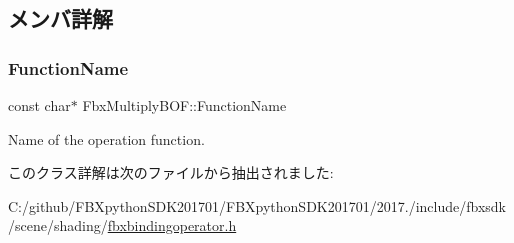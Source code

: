 \subsection{メンバ詳解}
\mbox{\label{class_fbx_multiply_b_o_f_aac9bacaab22a2dcd18c16b703892d35b}} 
\subsubsection{\texorpdfstring{Function\+Name}{FunctionName}}
{\footnotesize\ttfamily const char$\ast$ Fbx\+Multiply\+B\+O\+F\+::\+Function\+Name\hspace{0.3cm}{\ttfamily [static]}}



Name of the operation function. 



このクラス詳解は次のファイルから抽出されました\+:\begin{DoxyCompactItemize}
\item 
C\+:/github/\+F\+B\+Xpython\+S\+D\+K201701/\+F\+B\+Xpython\+S\+D\+K201701/2017./include/fbxsdk/scene/shading/\hyperlink{fbxbindingoperator_8h}{fbxbindingoperator.\+h}\end{DoxyCompactItemize}
